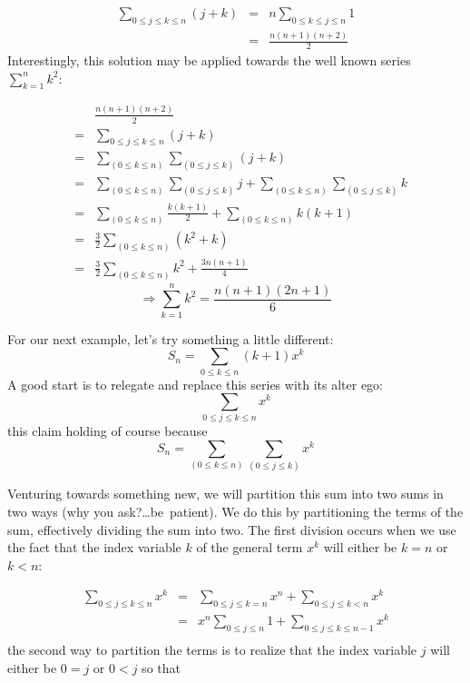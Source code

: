 \documentclass[twoside]{article}
\begin{document}
\begin{eqnarray*}
\sum_{0\le j\le k\le n}\!\!\!\!\! (j+k) 
 & = & n\!\!\!\!\!\!\sum_{0\le k\le j\le n}\!\!\!\!\! 1 \\
 & = & \frac{n(n+1)(n+2)}{2}
\end{eqnarray*} Interestingly, this solution may be applied 
towards the well known series $  \sum_{k=1}^nk^2  $:

\begin{eqnarray*}
 &   & \frac{n(n+1)(n+2)}{2}                                           \\
 & = & \sum_{0\le j\le k\le n}\!\!\!\!\! (j+k)                         \\
 & = & \sum_{(0\le k\le n)}\sum_{(0\le j\le k)}\!\!\!\! (j+k)          \\
 & = & \sum_{(0\le k\le n)}\sum_{(0\le j\le k)}\!\!\!\! j               
+\sum_{(0\le k\le n)}\sum_{(0\le j\le k)}\!\!\!\! k                    \\
 & = & \sum_{(0\le k\le n)}\!\!\!\!\!\frac{k(k+1)}{2}                   
+\sum_{(0\le k\le n)}\!\!\!\!\! k(k+1)                                 \\
 & = & \frac{3}{2}\sum_{(0\le k\le n)}\!\!\!\! (k^2+k)                 \\
 & = & \frac{3}{2}\sum_{(0\le k\le n)}\!\!\!\!\! k^2+\frac{3n(n+1)}{4}
\end{eqnarray*} 
$$  \Longrightarrow \sum_{k=1}^nk^2=\frac{n(n+1)(2n+1)}{6}  $$

For our next example, let's try something a little  
different: 
$$  S_n=\sum_{0\le k\le n}\!\! (k+1)x^k  $$
A good start is to relegate and replace this series with its alter ego:
$$  \sum_{0\le j\le k\le n}\!\!\!\!\! x^k  $$ this claim holding of
course because 
$$  S_n=\sum_{(0\le k\le n)}\sum_{(0\le j\le k)}\!\!\!\! x^k  $$

Venturing towards something new, we will partition this sum into 
two sums in two ways (why you ask?\mbox{\ldots be patient)}.  
We do this by partitioning the terms of the sum, effectively 
dividing the sum into two.  The first division occurs when we use 
the fact that the index variable $  k  $ of the general term 
$  x^k  $ will either be $  k=n  $ or $  k<n  $:

\begin{eqnarray*}
\sum_{0\le j\le k\le n}\!\!\!\!\! x^k             
 & = & \sum_{0\le j\le k=n}\!\!\!\!\! x^n        
 +\sum_{0\le j\le k<n}\!\!\!\!\! x^k            \\
 & = & x^n\!\!\!\sum_{0\le j\le n}\!\!\! 1             
 +\sum_{0\le j\le k\le n-1}\!\!\!\!\!\!\!\! x^k \\
\end{eqnarray*} the second way to partition the terms is to realize 
that the index variable $  j  $ will either be $  0=j  $ or $  0<j  $ 
so that 
\end{document}
